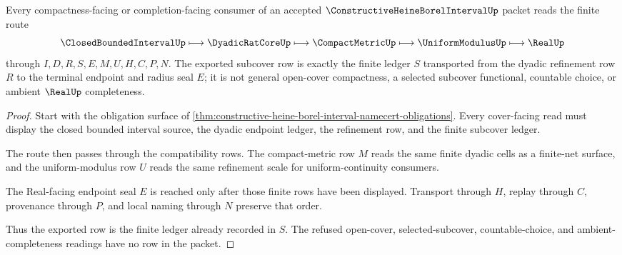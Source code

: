 \begin{theorem}
\label{thm:constructive-heine-borel-interval-finite-subcover-ledger}
Every compactness-facing or completion-facing consumer of an accepted $\ConstructiveHeineBorelIntervalUp$ packet reads the finite route
$$
\ClosedBoundedIntervalUp
\longmapsto
\DyadicRatCoreUp
\longmapsto
\CompactMetricUp
\longmapsto
\UniformModulusUp
\longmapsto
\RealUp
$$
through $I,D,R,S,E,M,U,H,C,P,N$. The exported subcover row is exactly the finite ledger $S$ transported from the dyadic refinement row $R$ to the terminal endpoint and radius seal $E$; it is not general open-cover compactness, a selected subcover functional, countable choice, or ambient $\RealUp$ completeness.
\end{theorem}
\begin{proof}
Start with the obligation surface of \autoref{thm:constructive-heine-borel-interval-namecert-obligations}. Every cover-facing read must display the closed bounded interval source, the dyadic endpoint ledger, the refinement row, and the finite subcover ledger.

The route then passes through the compatibility rows. The compact-metric row $M$ reads the same finite dyadic cells as a finite-net surface, and the uniform-modulus row $U$ reads the same refinement scale for uniform-continuity consumers.

The Real-facing endpoint seal $E$ is reached only after those finite rows have been displayed. Transport through $H$, replay through $C$, provenance through $P$, and local naming through $N$ preserve that order.

Thus the exported row is the finite ledger already recorded in $S$. The refused open-cover, selected-subcover, countable-choice, and ambient-completeness readings have no row in the packet.
\end{proof}



